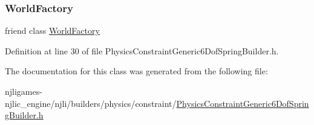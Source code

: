 \subsubsection{\texorpdfstring{World\+Factory}{WorldFactory}}
{\footnotesize\ttfamily friend class \mbox{\hyperlink{classnjli_1_1_world_factory}{World\+Factory}}\hspace{0.3cm}{\ttfamily [friend]}}



Definition at line 30 of file Physics\+Constraint\+Generic6\+Dof\+Spring\+Builder.\+h.



The documentation for this class was generated from the following file\+:\begin{DoxyCompactItemize}
\item 
njligames-\/njlic\+\_\+engine/njli/builders/physics/constraint/\mbox{\hyperlink{_physics_constraint_generic6_dof_spring_builder_8h}{Physics\+Constraint\+Generic6\+Dof\+Spring\+Builder.\+h}}\end{DoxyCompactItemize}
